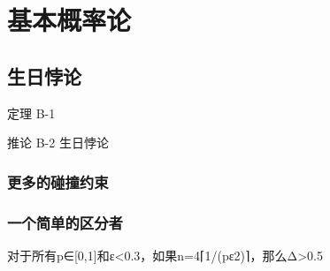 \chapter{基本概率论}\label{chap:B}

\section{生日悖论}\label{sec:B-1}

\begin{theorem}\label{theo:B-1}
	定理 B-1
\end{theorem}

\begin{corollary}\label{cor:B-2}
	推论 B-2 生日悖论
\end{corollary}

\subsection{更多的碰撞约束}\label{subsec:B-1-1}

\subsection{一个简单的区分者}\label{subsec:B-1-2}

\begin{theorem}\label{theo:B-3}
对于所有p∈[0,1]和ε<0.3，如果n=4⌈1/(pε2)⌉，那么Δ>0.5
\end{theorem}